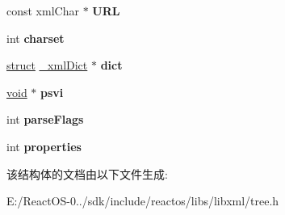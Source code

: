 \begin{DoxyCompactItemize}
const xml\+Char $\ast$ {\bfseries U\+RL}
\item 
\mbox{\label{struct__xml_doc_a32382a4784bbd3d6c928d8cd7349305b}} 
int {\bfseries charset}
\item 
\mbox{\label{struct__xml_doc_ab6f89d12264ac64a920ca920329f336f}} 
\hyperlink{interfacestruct}{struct} \hyperlink{struct__xml_dict}{\+\_\+xml\+Dict} $\ast$ {\bfseries dict}
\item 
\mbox{\label{struct__xml_doc_af22a189e5ec5b98d7992cac8ef3dbb38}} 
\hyperlink{interfacevoid}{void} $\ast$ {\bfseries psvi}
\item 
\mbox{\label{struct__xml_doc_a90811644cebded116c22868c9397a1ca}} 
int {\bfseries parse\+Flags}
\item 
\mbox{\label{struct__xml_doc_a9d5825f815564d4bf531fe5be8af7767}} 
int {\bfseries properties}
\end{DoxyCompactItemize}


该结构体的文档由以下文件生成\+:\begin{DoxyCompactItemize}
\item 
E\+:/\+React\+O\+S-\/0../sdk/include/reactos/libs/libxml/tree.\+h\end{DoxyCompactItemize}
